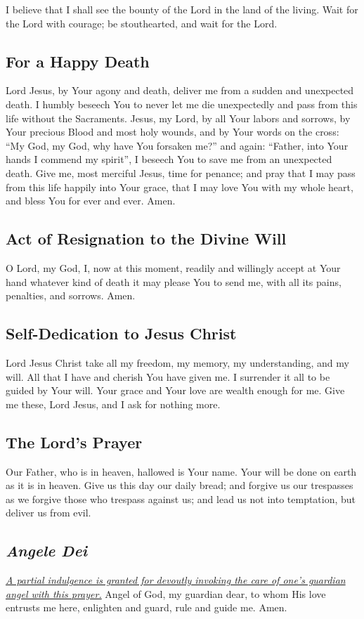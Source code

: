\documentclass[12pt]{article}
\newcommand{\prayertitle}[1]{\subsection{#1}}
\newcommand{\indulgencedprayertitle}[1]{\prayertitle{#1 \protect\kreuz}}
\newcommand{\foreign}[1]{\textsl{#1}}
\newcommand{\note}[1]{{\small{\textsl{#1}}}\newline}
\newcommand{\linkednote}[2]{\hyperlink{#1}{\note{#2}}}
\begin{document}
I believe that I shall see the bounty of the Lord in the land of the living.
Wait for the Lord with courage;
be stouthearted, and wait for the Lord.

\prayertitle{For a Happy Death}
Lord Jesus, by Your agony and death, deliver me from a sudden and unexpected death.
I humbly beseech You to never let me die unexpectedly and pass from this life without the Sacraments.
Jesus, my Lord, by all Your labors and sorrows, by Your precious Blood and most holy wounds, and by Your words on the cross:
``My God, my God, why have You forsaken me?''
and again:
``Father, into Your hands I commend my spirit'',
I beseech You to save me from an unexpected death.
Give me, most merciful Jesus, time for penance;
and pray that I may pass from this life happily into Your grace, that I may love You with my whole heart, and bless You for ever and ever.
Amen.

\prayertitle{Act of Resignation to the Divine Will}
O Lord, my God, I, now at this moment, readily and willingly accept at Your hand whatever kind of death it may please You to send me, with all its pains, penalties, and sorrows.
Amen.

\prayertitle{Self-Dedication to Jesus Christ}
Lord Jesus Christ take all my freedom, my memory, my understanding, and my will.
All that I have and cherish You have given me.
I surrender it all to be guided by Your will.
Your grace and Your love are wealth enough for me.
Give me these, Lord Jesus, and I ask for nothing more.

\prayertitle{The Lord's Prayer}
Our Father, who is in heaven, hallowed is Your name.
Your will be done on earth as it is in heaven.
Give us this day our daily bread;
and forgive us our trespasses as we forgive those who trespass against us;
and lead us not into temptation, but deliver us from evil.

\indulgencedprayertitle{\foreign{Angele Dei}}
\linkednote{grant18}{A partial indulgence is granted for devoutly invoking the care of one's guardian angel with this prayer.}
Angel of God, my guardian dear, to whom His love entrusts me here, enlighten and guard, rule and guide me. Amen.
\end{document}
